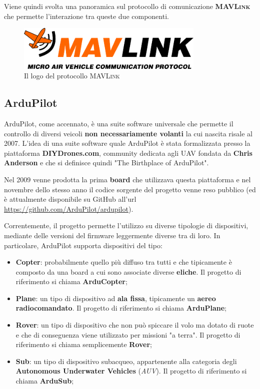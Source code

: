 \documentclass[a4paper, 12pt, oneside]{article}
\theoremstyle{definition}
\begin{document}
Viene quindi svolta una panoramica sul protocollo di comunicazione \textbf{\textsc{MAVLink}} che permette l'interazione tra queste due componenti.

\begin{figure}[H]
    \centering
    \includegraphics[width=0.8\textwidth]{images/logo_mavlink_small.png}
    \caption{Il logo del protocollo \textsc{MAVLink}}
\end{figure}

\newpage

\subsection{ArduPilot}

ArduPilot, come accennato, è una suite software universale che permette il controllo di diversi veicoli \textbf{non necessariamente volanti} \cite{ardupilot} la cui nascita risale al 2007.  L'idea di una suite software quale ArduPilot è stata formalizzata presso la piattaforma \textbf{DIYDrones.com}, community dedicata agli UAV fondata da \textbf{Chris Anderson} e che si definisce quindi "The Birthplace of ArduPilot"\cite{diy-drones}.

Nel 2009 venne prodotta la prima \textbf{board} che utilizzava questa piattaforma e nel novembre dello stesso anno il codice sorgente del progetto venne reso pubblico (ed è attualmente disponibile su GitHub all'url \url{https://github.com/ArduPilot/ardupilot})\cite{ardupilot-history}.

Correntemente, il progetto permette l'utilizzo su diverse tipologie di dispositivi, mediante delle versioni del firmware leggermente diverse tra di loro. In particolare, ArduPilot supporta dispositivi del tipo:

\begin{itemize}
    \item \textbf{Copter}: probabilmente quello più diffuso tra tutti e che tipicamente è composto da una board a cui sono associate diverse \textbf{eliche}. Il progetto di riferimento si chiama \textbf{ArduCopter}\cite{arducopter};
    \item \textbf{Plane}: un tipo di dispositivo ad \textbf{ala fissa}, tipicamente un \textbf{aereo radiocomandato}. Il progetto di riferimento si chiama \textbf{ArduPlane}\cite{arduplane};
    \item \textbf{Rover}: un tipo di dispositivo che non può spiccare il volo ma dotato di ruote e che di conseguenza viene utilizzato per missioni "a terra". Il progetto di riferimento si chiama semplicemente \textbf{Rover}\cite{rover};
    \item \textbf{Sub}: un tipo di dispositivo subacqueo, appartenente alla categoria degli \textbf{Autonomous Underwater Vehicles} (\textit{AUV}). Il progetto di riferimento si chiama \textbf{ArduSub}\cite{ardusub};
\end{itemize}
\end{document}
